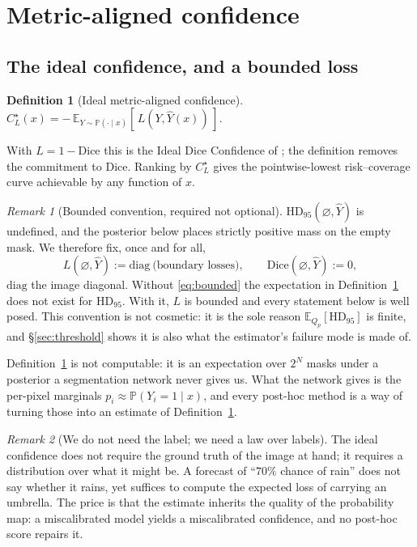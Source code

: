 \documentclass[11pt]{article}
\newtheorem{definition}{Definition}
\theoremstyle{remark}
\newtheorem{remark}{Remark}
\newcommand{\Yhat}{\widehat{Y}}
\newcommand{\HDF}{\mathrm{HD}_{95}}
\newcommand{\Dice}{\mathrm{Dice}}
\newcommand{\Ex}{\mathbb{E}}
\newcommand{\Prb}{\mathbb{P}}
\newcommand{\diag}{\mathrm{diag}}
\begin{document}
\section{Metric-aligned confidence}\label{sec:framework}

\subsection{The ideal confidence, and a bounded loss}

\begin{definition}[Ideal metric-aligned confidence]\label{def:ideal}
$C^\star_L(x) = -\,\Ex_{Y\sim\Prb(\cdot\mid x)}[\,L(Y,\Yhat(x))\,]$.
\end{definition}
With $L=1-\Dice$ this is the Ideal Dice Confidence of \cite{sdc}; the definition
removes the commitment to Dice. Ranking by $C^\star_L$ gives the pointwise-lowest
risk--coverage curve achievable by any function of $x$.

\begin{remark}[Bounded convention, required not optional]\label{rem:bounded}
$\HDF(\varnothing,\Yhat)$ is undefined, and the posterior below places strictly
positive mass on the empty mask. We therefore fix, once and for all,
\begin{equation}\label{eq:bounded}
L(\varnothing,\Yhat) := \diag \ \text{(boundary losses)}, \qquad
\Dice(\varnothing,\Yhat) := 0 ,
\end{equation}
$\diag$ the image diagonal. Without \eqref{eq:bounded} the expectation in
Definition~\ref{def:ideal} does not exist for $\HDF$. With it, $L$ is bounded and
every statement below is well posed. This convention is not cosmetic: it is the
sole reason $\Ex_{Q_p}[\HDF]$ is finite, and \S\ref{sec:threshold} shows it is
also what the estimator's failure mode is made of.
\end{remark}

Definition~\ref{def:ideal} is not computable: it is an expectation over $2^N$ masks
under a posterior a segmentation network never gives us. What the network gives is
the per-pixel marginals $p_i \approx \Prb(Y_i=1\mid x)$, and every post-hoc method
is a way of turning those into an estimate of Definition~\ref{def:ideal}.

\begin{remark}[We do not need the label; we need a law over labels]
The ideal confidence does not require the ground truth of the image at hand; it
requires a distribution over what it might be. A forecast of ``$70\%$ chance of
rain'' does not say whether it rains, yet suffices to compute the expected loss of
carrying an umbrella. The price is that the estimate inherits the quality of the
probability map: a miscalibrated model yields a miscalibrated confidence, and no
post-hoc score repairs it.
\end{remark}
\end{document}
